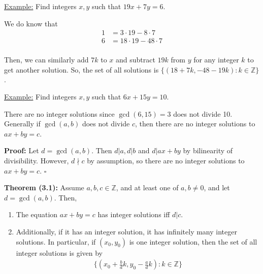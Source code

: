 \documentclass{article}
\newcommand*{\qed}{\hfill$\square$}%
\newcommand*{\zz}{\mathbb{Z}}%
\begin{document}
\underline{Example:} Find integers $x,y$ such that $19x+7y=6$. 

We do know that \begin{align*}
    1&= 3\cdot 19 - 8\cdot 7 \\
    6&= 18\cdot 19 - 48\cdot 7 \\
\end{align*}

Then, we can similarly add $7k$ to $x$ and subtract $19k$ from $y$ for any integer $k$ to get another solution. So, the set of all solutions is $\{ (18+7k, -48-19k) : k\in \zz \}$.

\underline{Example:} Find integers $x,y$ such that $6x+15y=10$. 

There are no integer solutions since $\gcd(6,15)=3$ does not divide 10. Generally if $\gcd(a,b)$ does not divide $c$, then there are no integer solutions to $ax+by=c$.

\textbf{Proof:} Let $d=\gcd(a,b)$. Then $d|a, d|b$ and $d|ax+by$ by bilinearity of divisibility. However, $d\nmid c$ by assumption, so there are no integer solutions to $ax+by=c$. \qed

\textbf{Theorem (3.1):} Assume $a,b,c\in \zz$, and at least one of $a,b\neq 0$, and let $d=\gcd(a,b)$. Then, \begin{enumerate}[(1)]
    \item The equation $ax+by=c$ has integer solutions iff $d|c$.
    \item Additionally, if it has an integer solution, it has infinitely many integer solutions. In particular, if $(x_0,y_0)$ is one integer solution, then the set of all integer solutions is given by \begin{align*}
        \{ (x_0 + \frac{b}{d}k, y_0 - \frac{a}{d}k) : k\in \zz \}
    \end{align*}
\end{enumerate}
\end{document}
